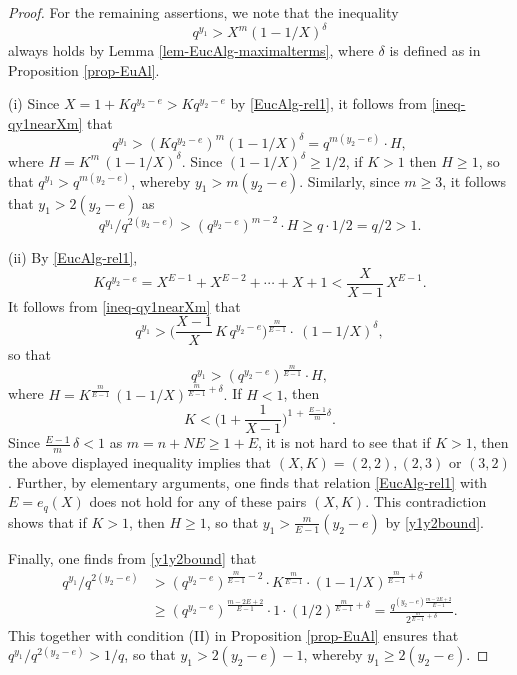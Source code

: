 \documentclass[11pt]{amsart}
\numberwithin{equation}{section}
\begin{document}
\begin{proof}
For the remaining assertions, we note that the inequality 
\begin{equation}\label{ineq-qy1nearXm}
q^{y_1} > X^m (1-1/X)^\delta
\end{equation}
always holds by Lemma \ref{lem-EucAlg-maximalterms}, where $\delta$ is defined as in Proposition \ref{prop-EuAl}.
%
\par (i) Since $X=1+K q^{y_2-e}>K q^{y_2-e}$ by \eqref{EucAlg-rel1}, it follows from \eqref{ineq-qy1nearXm} that
\[
q^{y_1} > (K q^{y_2-e})^m (1-1/X)^{\delta}= q^{m(y_2-e)} \cdot H,
\]
where $H=K^m\, (1-1/X)^{\delta}$.
Since $(1-1/X)^{\delta} \ge 1/2$, if $K>1$ then $H \ge 1$, so that $q^{y_1} > q^{m(y_2-e)}$, whereby $y_1>m(y_2-e)$.
Similarly, since $m \ge 3$, it follows that $y_1>2(y_2-e)$ as
\[
q^{y_1} / q^{2(y_2-e)} > (q^{y_2-e})^{m-2} \cdot H \ge q \cdot 1/2 = q/2 > 1.
\]
%
\par (ii) By \eqref{EucAlg-rel1}, %
\[
K q^{y_2-e} = X^{E-1}+X^{E-2}+ \cdots +X+1 < \frac{X}{X-1}\,X^{E-1}.
\]
It follows from \eqref{ineq-qy1nearXm} that
\[
q^{y_1} 
> \biggl( \frac{X-1}{X}\,K\,q^{y_2-e} \biggl)^{\frac{m}{E-1}} \cdot \ (1-1/X)^\delta,
\]
so that
\begin{equation}\label{y1y2bound}
q^{y_1} > (q^{y_2-e})^{\frac{m}{E-1}} \cdot H,
\end{equation}
where $H=K^{\frac{m}{E-1}}\,(1-1/X)^{\frac{m}{E-1}+\delta}.$
If $H<1$, then
\[
K<\biggl( 1+\frac{1}{X-1} \biggl)^{ 1\,+\,\frac{E-1}{m}\delta }.
\]
Since $\frac{E-1}{m}\,\delta<1$ as $m=n+NE \ge 1+E$, it is not hard to see that if $K>1$, then the above displayed inequality implies that $(X,K)=(2,2),(2,3)$ or $(3,2)$.
Further, by elementary arguments, one finds that relation \eqref{EucAlg-rel1} with $E=e_{q}(X)$ does not hold for any of these pairs $(X,K)$.
This contradiction shows that if $K>1$, then $H \ge 1$, so that $y_1>\frac{m}{E-1}(y_2-e)$ by \eqref{y1y2bound}.

Finally, one finds from \eqref{y1y2bound} that 
\begin{align*}
q^{y_1} / q^{2(y_2-e)}
&>(q^{y_2-e})^{\frac{m}{E-1}-2}\cdot K^{\frac{m}{E-1}}
\cdot (1-1/X)^{\frac{m}{E-1}+\delta}\\
&\ge (q^{y_2-e})^{\frac{m-2E+2}{E-1}}\cdot 1 \cdot (1/2)^{\frac{m}{E-1}+\delta}
=\frac{q^{(y_2-e)\frac{m-2E+2}{E-1}}}{2^{\frac{m}{E-1}+\delta}}.
\end{align*}
This together with condition {\rm (II)} in Proposition \ref{prop-EuAl} ensures that $q^{y_1} / q^{2(y_2-e)}>1/q$, so that $y_1>2(y_2-e)-1$, whereby $y_1 \ge 2(y_2-e)$.
\end{proof}
\end{document}
